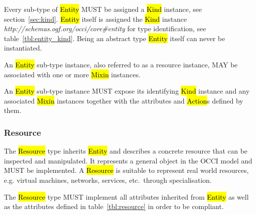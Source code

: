\documentclass[10pt,a4paper]{article}
\begin{document}
Every sub-type of \hl{Entity} MUST be assigned a \hl{Kind} instance,
see section~\ref{sec:kind}.
%
%
\hl{Entity} itself is assigned the \hl{Kind} instance
\textit{http://schemas.ogf.org/occi/core\#entity} for type
identification, see table~\ref{tbl:entity_kind}.
%
Being an abstract type \hl{Entity} itself can never be instantiated.

An \hl{Entity} sub-type instance, also referred to as a resource instance,
MAY be associated with one or more \hl{Mixin} instances.

An \hl{Entity} sub-type instance MUST expose its identifying \hl{Kind}
instance and any associated \hl{Mixin} instances together with the
attributes and \hl{Action}s defined by them.

\subsubsection{Resource}
\label{sec:resource}
The \hl{Resource} type inherits \hl{Entity} and describes a concrete
resource that can be inspected and manipulated. It represents a
general object in the OCCI model and MUST be implemented. A
\hl{Resource} is suitable to represent real world resources,
e.g. virtual machines, networks, services, etc.~through
specialisation.

The \hl{Resource} type MUST implement all attributes inherited from
\hl{Entity} as well as the attributes defined in
table~\ref{tbl:resource} in order to be compliant.
%
\end{document}

